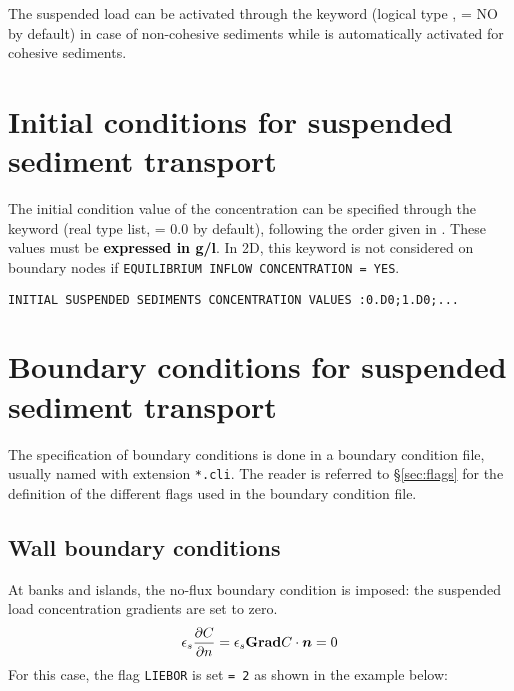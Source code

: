 The suspended load can be activated through the keyword  (logical type , {\ttfamily = NO} by default) in case of non-cohesive
sediments while is automatically activated for cohesive sediments.

\section{Initial conditions for suspended sediment transport}
The initial condition value of the concentration can be specified through the keyword  (real type list, {\ttfamily = 0.0} by default), following the order given in .
These values must be \textcolor{black}{\bf expressed in g/l}. In 2D, this keyword is not considered on boundary nodes if \texttt{EQUILIBRIUM INFLOW CONCENTRATION = YES}.\\

\begin{lstlisting}[frame=trBL]
INITIAL SUSPENDED SEDIMENTS CONCENTRATION VALUES :0.D0;1.D0;...
\end{lstlisting}

\section{Boundary conditions for suspended sediment transport}

The specification of boundary conditions is done in a boundary condition file, usually named with extension \texttt{*.cli}. The reader is referred to \S\ref{sec:flags} for the definition of the different flags used in the boundary condition file.

\subsection{Wall boundary conditions}
At banks and islands, the no-flux boundary condition is imposed: the suspended load concentration gradients are set to zero.
\begin{equation}
\label{eq:BC-noflux}
\epsilon_s\frac{\partial C}{\partial n}=\epsilon_s \text{\bfseries{Grad}} C \cdot \bm{n}=0
\end{equation}
For this case, the flag \texttt{LIEBOR} is set \texttt{= 2} as shown in the example below:

